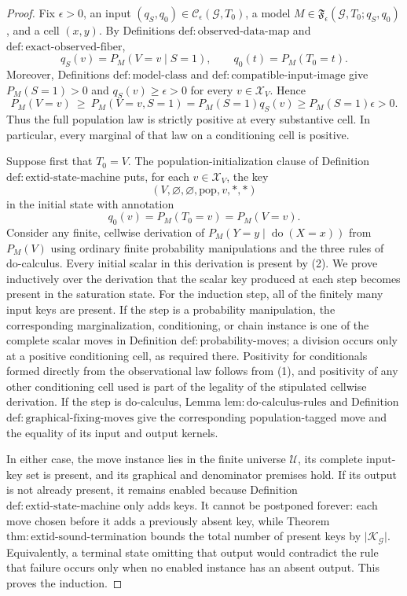 \documentclass{article}
\begin{document}
\begin{proof}
Fix \(\epsilon>0\), an input \((q_S,q_0)\in\mathcal C_{\epsilon}(\mathcal G,T_0)\), a model \(M\in\mathfrak F_{\epsilon}(\mathcal G,T_0;q_S,q_0)\), and a cell \((x,y)\).  By Definitions \(\mathrm{def{:}observed\text{-}data\text{-}map}\) and \(\mathrm{def{:}exact\text{-}observed\text{-}fiber}\),
\[
q_S(v)=P_M(V=v\mid S=1),\qquad q_0(t)=P_M(T_0=t).
\]
Moreover, Definitions \(\mathrm{def{:}model\text{-}class}\) and \(\mathrm{def{:}compatible\text{-}input\text{-}image}\) give \(P_M(S=1)>0\) and \(q_S(v)\geq\epsilon>0\) for every \(v\in\mathcal X_V\).  Hence
\[
P_M(V=v)\ \geq\ P_M(V=v,S=1)
=P_M(S=1)q_S(v)
\geq P_M(S=1)\epsilon>0. \tag{1}
\]
Thus the full population law is strictly positive at every substantive cell.  In particular, every marginal of that law on a conditioning cell is positive.

Suppose first that \(T_0=V\).  The population-initialization clause of Definition \(\mathrm{def{:}extid\text{-}state\text{-}machine}\) puts, for each \(v\in\mathcal X_V\), the key
\[
 (V,\varnothing,\varnothing,\mathrm{pop},v,\ast,\ast)
\]
in the initial state with annotation
\[
q_0(v)=P_M(T_0=v)=P_M(V=v). \tag{2}
\]
Consider any finite, cellwise derivation of \(P_M(Y=y\mid\operatorname{do}(X=x))\) from \(P_M(V)\) using ordinary finite probability manipulations and the three rules of do-calculus.  Every initial scalar in this derivation is present by (2).  We prove inductively over the derivation that the scalar key produced at each step becomes present in the saturation state.  For the induction step, all of the finitely many input keys are present.  If the step is a probability manipulation, the corresponding marginalization, conditioning, or chain instance is one of the complete scalar moves in Definition \(\mathrm{def{:}probability\text{-}moves}\); a division occurs only at a positive conditioning cell, as required there.  Positivity for conditionals formed directly from the observational law follows from (1), and positivity of any other conditioning cell used is part of the legality of the stipulated cellwise derivation.  If the step is do-calculus, Lemma \(\mathrm{lem{:}do\text{-}calculus\text{-}rules}\) and Definition \(\mathrm{def{:}graphical\text{-}fixing\text{-}moves}\) give the corresponding population-tagged move and the equality of its input and output kernels.

In either case, the move instance lies in the finite universe \(\mathscr U\), its complete input-key set is present, and its graphical and denominator premises hold.  If its output is not already present, it remains enabled because Definition \(\mathrm{def{:}extid\text{-}state\text{-}machine}\) only adds keys.  It cannot be postponed forever: each move chosen before it adds a previously absent key, while Theorem \(\mathrm{thm{:}extid\text{-}sound\text{-}termination}\) bounds the total number of present keys by \(\lvert\mathscr K_{\mathcal G}\rvert\).  Equivalently, a terminal state omitting that output would contradict the rule that failure occurs only when no enabled instance has an absent output.  This proves the induction.


\end{proof}
\end{document}

